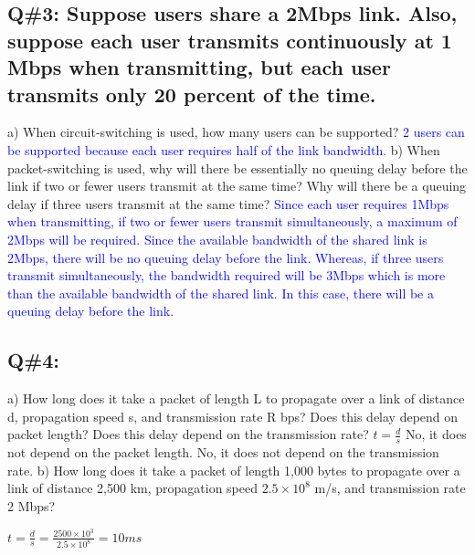 \subsection*{Q\#3: Suppose users share a 2Mbps link. Also, suppose each user transmits continuously at 1 Mbps when transmitting, but each user transmits only 20 percent of the time.}
a) When circuit-switching is used, how many users can be supported?
\newline
\textcolor{blue}{2 users can be supported because each user requires half of the link bandwidth.}
\newline
b) When packet-switching is used, why will there be essentially no queuing delay before the link if two or fewer users transmit at the same time? Why will there be a queuing delay if three users transmit at the same time?
\newline
\textcolor{blue}{Since each user requires 1Mbps when transmitting, if two or fewer users transmit simultaneously, a maximum of 2Mbps will be required. Since the available bandwidth of the shared link is 2Mbps, there will be no queuing delay before the link. Whereas, if three users transmit simultaneously, the bandwidth required will be 3Mbps which is more than the available bandwidth of the shared link. In this case, there will be a queuing delay before the link.}
\subsection*{Q\#4:}
a) How long does it take a packet of length L to propagate over a link of distance d, propagation speed s, and transmission rate R bps? Does this delay depend on packet length? Does this delay depend on the transmission rate?
$t = \frac{d}{s}$
\newline
No, it does not depend on the packet length.
\newline
No, it does not depend on the transmission rate.
\newline
b) How long does it take a packet of length 1,000 bytes to propagate over a link of distance 2,500 km, propagation speed $2.5 \times 10^8$ m/s, and transmission rate 2 Mbps?
\newline
\begin{center}
\(t = \frac{d}{s} = \frac{2500 \times 10^3}{2.5 \times 10^8} = 10 ms\)
\end{center}
